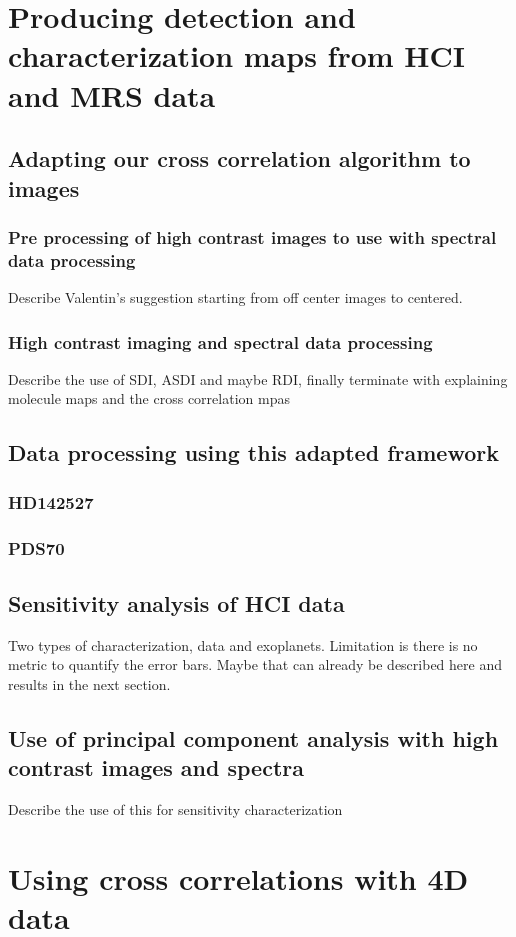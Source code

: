 \chapter{Producing detection and characterization maps from HCI and MRS data}
\section{Adapting our cross correlation algorithm to images}
\subsection{Pre processing of high contrast images to use with spectral data processing}
Describe Valentin's suggestion starting from off center images to centered.
\subsection{High contrast imaging and spectral data processing}
Describe the use of SDI, ASDI and maybe RDI, finally terminate with explaining molecule maps and the cross correlation mpas
\section{Data processing using this adapted framework}
\subsection{HD142527}
\subsection{PDS70}
\section{Sensitivity analysis of HCI data}
Two types of characterization, data and exoplanets.
Limitation is there is no metric to quantify the error bars. Maybe that can already be described here and results in the next section.
\section{Use of principal component analysis with high contrast images and spectra}
Describe the use of this for sensitivity characterization
\chapter{Using cross correlations with 4D data}
